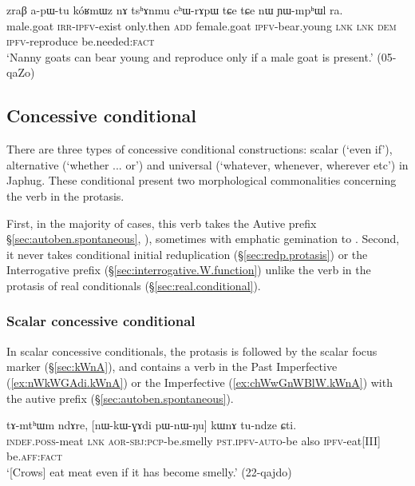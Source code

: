 \begin{exe}
	\ex \label{ex:nWkoRmWznA.only.if2}
	\gll zraβ a-pɯ-tu kóʁmɯz nɤ tsʰɤnmu cʰɯ-rɤpɯ tɕe tɕe nɯ ɲɯ-mpʰɯl ra.\\
	male.goat \textsc{irr}-\textsc{ipfv}-exist only.then \textsc{add} female.goat \textsc{ipfv}-bear.young \textsc{lnk} \textsc{lnk} \textsc{dem} \textsc{ipfv}-reproduce be.needed:\textsc{fact} \\
	\glt `Nanny goats can bear young and reproduce only if a male goat is present.' (05-qaZo)
\end{exe}
 
 \subsection{Concessive conditional} \label{sec:concessive.conditional}
There are three types of concessive conditional constructions: scalar (`even if'), alternative (`whether ... or') and universal (`whatever, whenever, wherever etc') in Japhug. These conditional present two morphological commonalities concerning the verb in the protasis. 

First, in the majority of cases, this verb  takes the Autive prefix   §\ref{sec:autoben.spontaneous}, \citealt[298--300]{jacques14linking}), sometimes with emphatic gemination to . Second, it never takes  conditional initial reduplication (§\ref{sec:redp.protasis}) or the Interrogative prefix (§\ref{sec:interrogative.W.function}) unlike the verb in the protasis of real conditionals (§\ref{sec:real.conditional}).  

 
\subsubsection{Scalar concessive conditional} \label{sec:scalar.concessive.conditional}
In scalar concessive conditionals, the protasis is followed by the scalar focus marker  (§\ref{sec:kWnA}), and contains a verb  in the Past Imperfective (\ref{ex:nWkWGAdi.kWnA}) or the Imperfective (\ref{ex:chWwGnWBlW.kWnA}) with the autive prefix (§\ref{sec:autoben.spontaneous}).
 
\begin{exe}
\ex \label{ex:nWkWGAdi.kWnA}
 \gll tɤ-mtʰɯm ndɤre, [nɯ-kɯ-ɣɤdi pɯ-nɯ-ŋu] kɯnɤ tu-ndze ɕti. \\
 \textsc{indef}.\textsc{poss}-meat \textsc{lnk} \textsc{aor}-\textsc{sbj}:\textsc{pcp}-be.smelly \textsc{pst}.\textsc{ipfv}-\textsc{auto}-be also \textsc{ipfv}-eat[III] be.\textsc{aff}:\textsc{fact} \\
\glt `[Crows] eat meat even if it has become smelly.' (22-qajdo)
 \end{exe}
 
